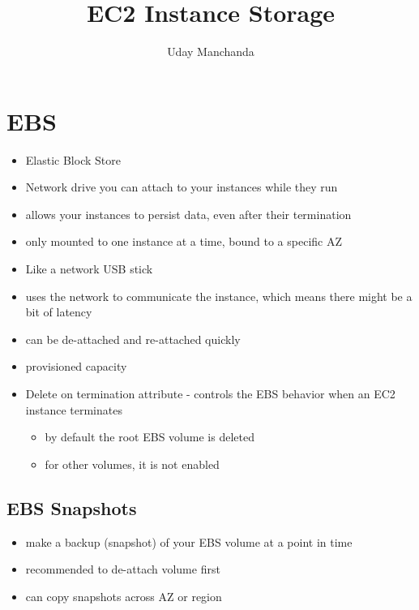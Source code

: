 \documentclass[]{scrartcl}
\title{EC2 Instance Storage}
\author{Uday Manchanda}
\begin{document}
\maketitle

\section{EBS}
\begin{itemize}
	\item Elastic Block Store
	\item Network drive you can attach to your instances while they run
	\item allows your instances to persist data, even after their termination
	\item only mounted to one instance at a time, bound to a specific AZ
	\item Like a network USB stick
	\item uses the network to communicate the instance, which means there might be a bit of latency
	\item can be de-attached and re-attached quickly
	\item provisioned capacity
	\item Delete on termination attribute - controls the EBS behavior when an EC2 instance terminates
	\begin{itemize}
		\item by default the root EBS volume is deleted
		\item for other volumes, it is not enabled
	\end{itemize}
\end{itemize}

\subsection{EBS Snapshots}
\begin{itemize}
	\item make a backup (snapshot) of your EBS volume at a point in time
	\item recommended to de-attach volume first
	\item can copy snapshots across AZ or region
\end{itemize}
\end{document}
